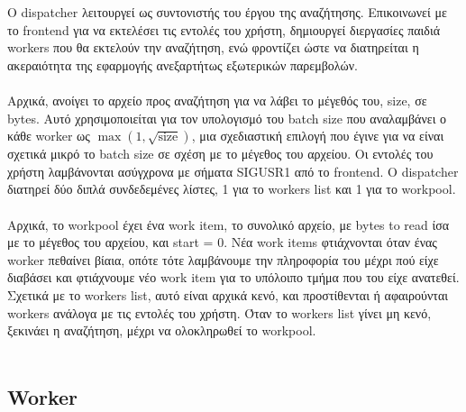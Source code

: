 \documentclass{article}
\begin{document}
	Ο dispatcher λειτουργεί ως συντονιστής του έργου της αναζήτησης. Επικοινωνεί με το frontend για να εκτελέσει τις εντολές του χρήστη, δημιουργεί διεργασίες παιδιά workers που θα εκτελούν την αναζήτηση, ενώ φροντίζει ώστε να διατηρείται η ακεραιότητα της εφαρμογής ανεξαρτήτως εξωτερικών παρεμβολών.\\
	\\
	Αρχικά, ανοίγει το αρχείο προς αναζήτηση για να λάβει το μέγεθός του, size, σε bytes. Αυτό χρησιμοποιείται για τον υπολογισμό του batch size που αναλαμβάνει ο κάθε worker ως $\max(1, \sqrt{\text{size}})$, μια σχεδιαστική επιλογή που έγινε για να είναι σχετικά μικρό το batch size σε σχέση με το μέγεθος του αρχείου. Οι εντολές του χρήστη λαμβάνονται ασύγχρονα με σήματα SIGUSR1 από το frontend. Ο dispatcher διατηρεί δύο διπλά συνδεδεμένες λίστες, 1 για το workers list και 1 για το workpool.\\
	\\
	Αρχικά, το workpool έχει ένα work item, το συνολικό αρχείο, με bytes to read ίσα με το μέγεθος του αρχείου, και start = 0. Νέα work items φτιάχνονται όταν ένας worker πεθαίνει βίαια, οπότε τότε λαμβάνουμε την πληροφορία του μέχρι πού είχε διαβάσει και φτιάχνουμε νέο work item για το υπόλοιπο τμήμα που του είχε ανατεθεί. Σχετικά με το workers list, αυτό είναι αρχικά κενό, και προστίθενται ή αφαιρούνται workers ανάλογα με τις εντολές του χρήστη. Όταν το workers list γίνει μη κενό, ξεκινάει η αναζήτηση, μέχρι να ολοκληρωθεί το workpool.\\
	\\
	

	\subsection{Worker}
\end{document}
